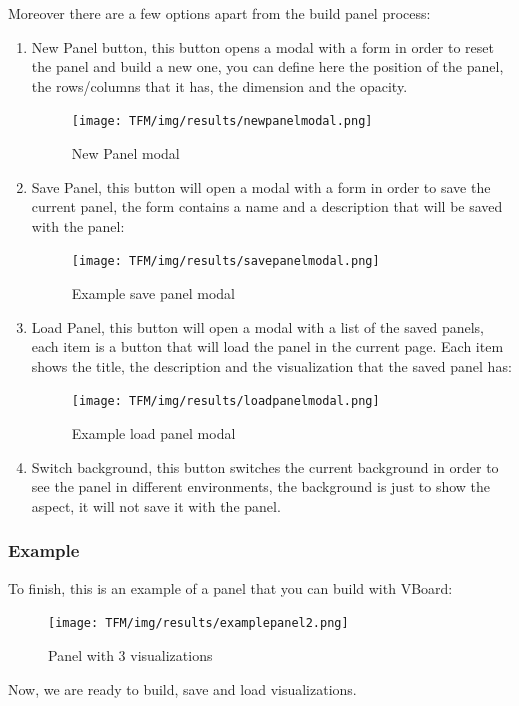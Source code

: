 \documentclass[a4paper, 12pt]{book}
\begin{document}
Moreover there are a few options apart from the build panel process:
\begin{enumerate}
    \item New Panel button, this button opens a modal with a form in order to reset the panel and build a new one, you can define here the position of the panel, the rows/columns that it has, the dimension and the opacity.
    \begin{figure}[H]
      \centering
      \texttt{[image: TFM/img/results/newpanelmodal.png]}
      \caption{New Panel modal}
      \label{fig:onlynodes}
    \end{figure}
    \item Save Panel, this button will open a modal with a form in order to save the current panel, the form contains a name and a description that will be saved with the panel:
    \begin{figure}[H]
      \centering
      \texttt{[image: TFM/img/results/savepanelmodal.png]}
      \caption{Example save panel modal}
      \label{fig:onlynodes}
    \end{figure}
   \item Load Panel, this button will open a modal with a list of the saved panels, each item is a button that will load the panel in the current page. Each item shows the title, the description and the visualization that the saved panel has:
    \begin{figure}[H]
      \centering
      \texttt{[image: TFM/img/results/loadpanelmodal.png]}
      \caption{Example load panel modal}
      \label{fig:onlynodes}
    \end{figure}
    \item Switch background, this button switches the current background in order to see the panel in different environments, the background is just to show the aspect, it will not save it with the panel.
\end{enumerate}


\subsubsection{Example}
To finish, this is an example of a panel that you can build with VBoard:

\begin{figure}[H]
  \centering
  \texttt{[image: TFM/img/results/examplepanel2.png]}
  \caption{Panel with 3 visualizations}
  \label{fig:onlynodes}
\end{figure}

Now, we are ready to build, save and load visualizations.
\end{document}
